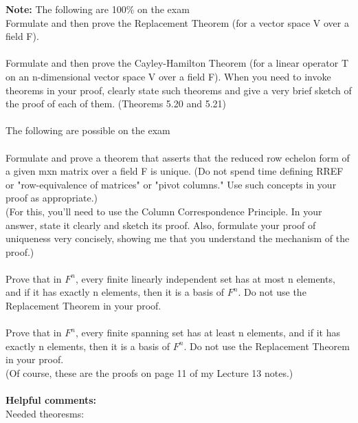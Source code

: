 \documentclass[answers,12pt,addpoints]{exam}
\begin{document}
\textbf{Note:}
The following are 100\% on the exam \\
Formulate and then prove the Replacement Theorem (for a vector space V
over a field F).\\\\
Formulate and then prove the Cayley-Hamilton Theorem (for a linear
operator T on an n-dimensional vector space V over a field F).  When
you need to invoke theorems in your proof, clearly state such theorems
and give a very brief sketch of the proof of each of them. (Theorems 5.20 and 5.21)\\\\
The following are possible on the exam \\\\
Formulate and prove a theorem that asserts that the reduced row
echelon form of a given mxn matrix over a field F is unique.  (Do not
spend time defining RREF or "row-equivalence of matrices" or "pivot
columns."  Use such concepts in your proof as appropriate.)\\
(For this, you'll need to use the Column Correspondence Principle.
In your answer, state it clearly and sketch its proof.  Also, formulate your proof of
uniqueness very concisely, showing me that you understand the
mechanism of the proof.)\\\\
Prove that in $F^n$, every finite linearly independent set has at most n
elements, and if it has exactly n elements, then it is a basis of $F^n$.
Do not use the Replacement Theorem in your proof.\\\\
Prove that in $F^n$, every finite spanning set has at least n elements,
and if it has exactly n elements, then it is a basis of $F^n$.  Do not
use the Replacement Theorem in your proof.\\
(Of course, these are the proofs on page 11 of my Lecture 13 notes.)\\\\
\textbf{Helpful comments:}\\
Needed theoresms:
\end{document}
